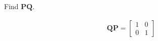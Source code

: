 Find $\boldsymbol{PQ}$.


\begin{solution}
\begin{align*}
    \boldsymbol{QP} = \begin{bmatrix}
        1 & 0 \\
        0 & 1
    \end{bmatrix}
\end{align*}
\end{solution}